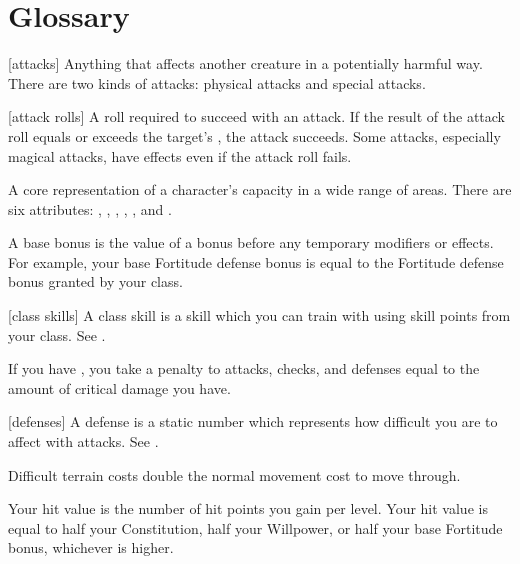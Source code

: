 \chapter{Glossary}\label{Glossary}

[attacks] Anything that affects another creature in a potentially harmful way. There are two kinds of attacks: physical attacks and special attacks.

[attack rolls] A roll required to succeed with an attack. If the result of the attack roll equals or exceeds the target's , the attack succeeds. Some attacks, especially magical attacks, have effects even if the attack roll fails.

 A core representation of a character's capacity in a wide range of areas. There are six attributes: , , , , , and .

 A base bonus is the value of a bonus before any temporary modifiers or effects. For example, your base Fortitude defense bonus is equal to the Fortitude defense bonus granted by your class.

[class skills] A class skill is a skill which you can train with using skill points from your class. See .

 If you have , you take a penalty to attacks, checks, and defenses equal to the amount of critical damage you have.

[defenses] A defense is a static number which represents how difficult you are to affect with attacks. See .

 Difficult terrain costs double the normal movement cost to move through.

 Your hit value is the number of hit points you gain per level. Your hit value is equal to half your Constitution, half your Willpower, or half your base Fortitude bonus, whichever is higher.
